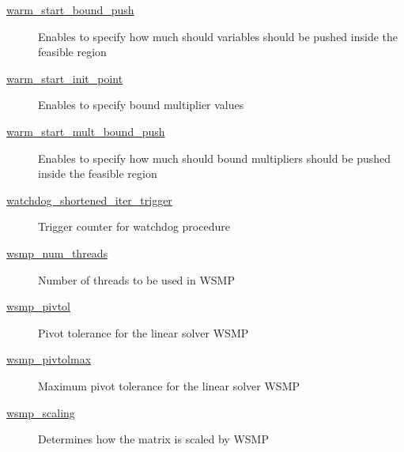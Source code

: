 \begin{description}
\item[{\hyperref[sec:warm_start_bound_push]{warm\_start\_bound\_push}}] Enables to specify how much should variables should be pushed inside the feasible region
\item[{\hyperref[sec:warm_start_init_point]{warm\_start\_init\_point}}] Enables to specify bound multiplier values
\item[{\hyperref[sec:warm_start_mult_bound_push]{warm\_start\_mult\_bound\_push}}] Enables to specify how much should bound multipliers should be pushed inside the feasible region
\item[{\hyperref[sec:watchdog_shortened_iter_trigger]{watchdog\_shortened\_iter\_trigger}}] Trigger counter for watchdog procedure
\item[{\hyperref[sec:wsmp_num_threads]{wsmp\_num\_threads}}] Number of threads to be used in WSMP
\item[{\hyperref[sec:wsmp_pivtol]{wsmp\_pivtol}}] Pivot tolerance for the linear solver WSMP
\item[{\hyperref[sec:wsmp_pivtolmax]{wsmp\_pivtolmax}}] Maximum pivot tolerance for the linear solver WSMP
\item[{\hyperref[sec:wsmp_scaling]{wsmp\_scaling}}] Determines how the matrix is scaled by WSMP
\end{description}
